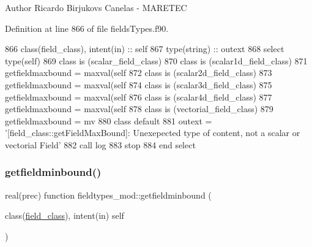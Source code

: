 \begin{DoxyAuthor}{Author}
Ricardo Birjukovs Canelas -\/ M\+A\+R\+E\+T\+EC 
\end{DoxyAuthor}


Definition at line 866 of file fields\+Types.\+f90.


\begin{DoxyCode}
866     \textcolor{keywordtype}{class}(field\_class), \textcolor{keywordtype}{intent(in)} :: self
867     \textcolor{keywordtype}{type}(string) :: outext
868     \textcolor{keywordflow}{select type}(self)
869 \textcolor{keywordflow}{    class is} (scalar\_field\_class)
870 \textcolor{keywordflow}{    class is} (scalar1d\_field\_class)
871         getfieldmaxbound = maxval(self%
872 \textcolor{keywordflow}{    class is} (scalar2d\_field\_class)
873         getfieldmaxbound = maxval(self%
874 \textcolor{keywordflow}{    class is} (scalar3d\_field\_class)
875         getfieldmaxbound = maxval(self%
876 \textcolor{keywordflow}{    class is} (scalar4d\_field\_class)
877         getfieldmaxbound = maxval(self%
878 \textcolor{keywordflow}{    class is} (vectorial\_field\_class)
879         getfieldmaxbound = mv
880 \textcolor{keywordflow}{        class default}
881         outext = \textcolor{stringliteral}{'[field\_class::getFieldMaxBound]: Unexepected type of content, not a scalar or vectorial
       Field'}
882         \textcolor{keyword}{call }log%
883         stop
884 \textcolor{keywordflow}{    end select}
\end{DoxyCode}
\mbox{\label{namespacefieldtypes__mod_aec092e7c0b82a7b3a828ae18af80b810}} 
\subsubsection{\texorpdfstring{getfieldminbound()}{getfieldminbound()}}
{\footnotesize\ttfamily real(prec) function fieldtypes\+\_\+mod\+::getfieldminbound (\begin{DoxyParamCaption}\item[{class(\mbox{\hyperlink{structfieldtypes__mod_1_1field__class}{field\+\_\+class}}), intent(in)}]{self }\end{DoxyParamCaption})\hspace{0.3cm}{\ttfamily [private]}}



